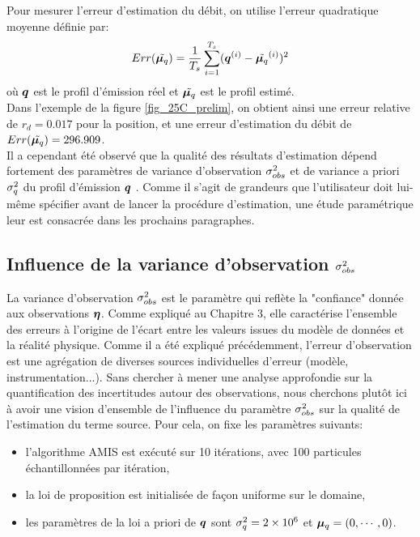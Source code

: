  Pour mesurer l'erreur d'estimation du débit, on utilise l'erreur quadratique moyenne définie par:
 \begin{equation}
	 Err(\tilde{{\bm{\mu}_q}}) = \dfrac{1}{T_s} \sum\limits_{i=1}^{T_s}({\bm{q}}^{(i)} - \tilde{{\bm{\mu}_q}}^{(i)})^2
 \end{equation}
 où ${\bm{q}}$ est le profil d'émission réel et $\tilde{{\bm{\mu}_q}}$ est le profil estimé.\\
 
 Dans l'exemple de la figure \ref{fig_25C_prelim}, on obtient ainsi une erreur relative de $r_d = 0.017$ pour la position, et une erreur d'estimation du débit de $Err(\tilde{{\bm{\mu}_q}}) = 296.909$. \\
 
 Il a cependant été observé que la qualité des résultats d'estimation dépend fortement des paramètres de variance d'observation ${\sigma_{obs}^2}$ et de variance a priori $\sigma_q^2$ du profil d'émission ${\bm{q}}$ . Comme il s'agit de grandeurs que l'utilisateur doit lui-même spécifier avant de lancer la procédure d'estimation, une étude paramétrique leur est consacrée dans les prochains paragraphes.
 
 \subsection{Influence de la variance d'observation ${\sigma_{obs}^2}$}
 
 La variance d'observation ${\sigma_{obs}^2}$ est le paramètre qui reflète la "confiance" donnée aux observations ${\bm{\eta}}$. Comme expliqué au Chapitre 3, elle caractérise l'ensemble des erreurs à l'origine de l'écart entre les valeurs issues du modèle de données et la réalité physique. Comme il a été expliqué précédemment, l'erreur d'observation est une agrégation de diverses sources individuelles d'erreur (modèle, instrumentation...). Sans chercher à mener une analyse approfondie sur la quantification des incertitudes autour des observations, nous cherchons plutôt ici à avoir une vision d'ensemble de l'influence du paramètre ${\sigma_{obs}^2}$ sur la qualité de l'estimation du terme source. Pour cela, on fixe les paramètres suivants:\\
 
 \begin{itemize}
 	\item l'algorithme AMIS est exécuté sur 10 itérations, avec 100 particules échantillonnées par itération,
 	\item la loi de proposition est initialisée de façon uniforme sur le domaine,
 	\item les paramètres de la loi a priori de ${\bm{q}}$ sont $\sigma_q^2 = 2\times10^6$ et ${\bm{\mu}_q} = (0,\cdots, 0)$.\\
 \end{itemize}
 
